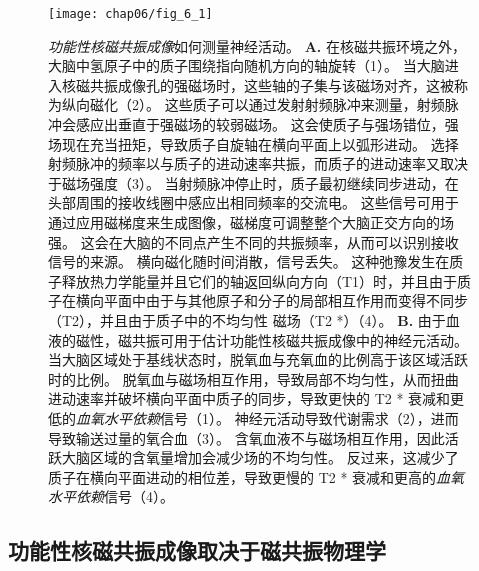 \begin{figure}[htbp]
	\centering
	\texttt{[image: chap06/fig\_6\_1]}
	\caption{\textit{功能性核磁共振成像}如何测量神经活动。
		\textbf{A.} 在核磁共振环境之外，大脑中氢原子中的质子围绕指向随机方向的轴旋转（1）。
		当大脑进入核磁共振成像孔的强磁场时，这些轴的子集与该磁场对齐，这被称为纵向磁化（2）。
		这些质子可以通过发射射频脉冲来测量，射频脉冲会感应出垂直于强磁场的较弱磁场。
		这会使质子与强场错位，强场现在充当扭矩，导致质子自旋轴在横向平面上以弧形进动。
		选择射频脉冲的频率以与质子的进动速率共振，而质子的进动速率又取决于磁场强度（3）。
		当射频脉冲停止时，质子最初继续同步进动，在头部周围的接收线圈中感应出相同频率的交流电。
		这些信号可用于通过应用磁梯度来生成图像，磁梯度可调整整个大脑正交方向的场强。
		这会在大脑的不同点产生不同的共振频率，从而可以识别接收信号的来源。
		横向磁化随时间消散，信号丢失。
		这种弛豫发生在质子释放热力学能量并且它们的轴返回纵向方向（T1）时，并且由于质子在横向平面中由于与其他原子和分子的局部相互作用而变得不同步（T2），并且由于质子中的不均匀性 磁场（T2 *）（4）。
		\textbf{B.} 由于血液的磁性，磁共振可用于估计功能性核磁共振成像中的神经元活动。
		当大脑区域处于基线状态时，脱氧血与充氧血的比例高于该区域活跃时的比例。
		脱氧血与磁场相互作用，导致局部不均匀性，从而扭曲进动速率并破坏横向平面中质子的同步，导致更快的 T2 * 衰减和更低的\textit{血氧水平依赖}信号（1）。
		神经元活动导致代谢需求（2），进而导致输送过量的氧合血（3）。
		含氧血液不与磁场相互作用，因此活跃大脑区域的含氧量增加会减少场的不均匀性。
		反过来，这减少了质子在横向平面进动的相位差，导致更慢的 T2 * 衰减和更高的\textit{血氧水平依赖}信号（4）。}
	\label{fig:6_1}
\end{figure}



\subsection{功能性核磁共振成像取决于磁共振物理学}

